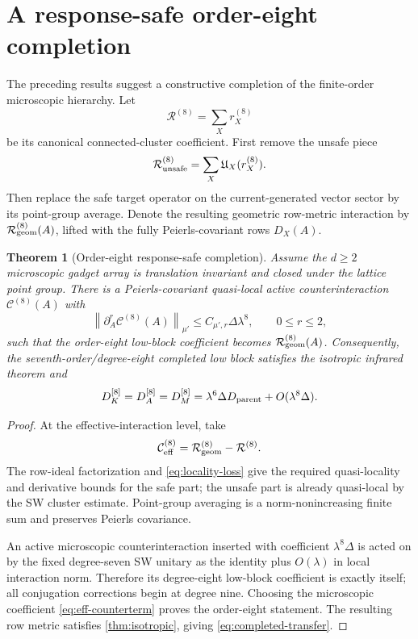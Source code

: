 \documentclass[11pt]{article}
\newtheorem{theorem}{Theorem}[section]
\theoremstyle{definition}
\theoremstyle{remark}
\newcommand{\cC}{\mathcal C}
\newcommand{\cR}{\mathcal R}
\newcommand{\norm}[1]{\left\lVert #1\right\rVert}
\begin{document}
\section{A response-safe order-eight completion}
\label{sec:completion}

The preceding results suggest a constructive completion of the finite-order
microscopic hierarchy.  Let
\begin{equation}
 \cR^{(8)}=\sum_Xr_X^{(8)}
 \label{eq:R8-clusters}
\end{equation}
be its canonical connected-cluster coefficient.  First remove the unsafe
piece
\begin{equation}
 \cR_{\rm unsafe}^{(8)}
 =\sum_X\mathfrak U_X(r_X^{(8)}).
 \label{eq:unsafe-sum}
\end{equation}
Then replace the safe target operator on the current-generated vector sector
by its point-group average.  Denote the resulting geometric row-metric
interaction by $\cR_{\rm geom}^{(8)}(A)$, lifted with the fully Peierls-covariant
rows $D_X(A)$.

\begin{theorem}[Order-eight response-safe completion]
\label{thm:completion}
Assume the $d\ge2$ microscopic gadget array is translation invariant and
closed under the lattice point group.  There is a Peierls-covariant quasi-local
active counterinteraction $\cC^{(8)}(A)$ with
\begin{equation}
 \norm{\partial_A^r\cC^{(8)}(A)}_{\mu'}
 \le C_{\mu',r}\Delta\lambda^8,
 \qquad 0\le r\le2,
 \label{eq:counterterm-bound}
\end{equation}
such that the order-eight low-block coefficient becomes
$\cR_{\rm geom}^{(8)}(A)$.  Consequently, the seventh-order/degree-eight
completed low block satisfies the isotropic infrared theorem and
\begin{equation}
 D_K^{[8]}=D_A^{[8]}=D_M^{[8]}
 =\lambda^6\Delta D_{\rm parent}+O(\lambda^8\Delta).
 \label{eq:completed-transfer}
\end{equation}
\end{theorem}

\begin{proof}
At the effective-interaction level, take
\begin{equation}
 \cC^{(8)}_{\rm eff}
 =\cR_{\rm geom}^{(8)}-\cR^{(8)}.
 \label{eq:eff-counterterm}
\end{equation}
The row-ideal factorization and \eqref{eq:locality-loss} give the required
quasi-locality and derivative bounds for the safe part; the unsafe part is
already quasi-local by the SW cluster estimate.  Point-group averaging is a
norm-nonincreasing finite sum and preserves Peierls covariance.

An active microscopic counterinteraction inserted with coefficient
$\lambda^8\Delta$ is acted on by the fixed degree-seven SW unitary as the
identity plus $O(\lambda)$ in local interaction norm.  Therefore its degree-eight
low-block coefficient is exactly itself; all conjugation corrections begin at
degree nine.  Choosing the microscopic coefficient
\eqref{eq:eff-counterterm} proves the order-eight statement.  The resulting
row metric satisfies \cref{thm:isotropic}, giving
\eqref{eq:completed-transfer}.
\end{proof}
\end{document}

